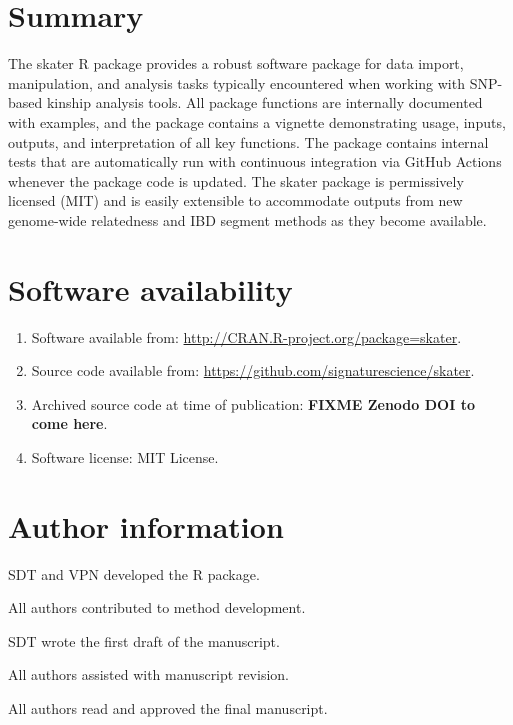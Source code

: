 \documentclass[9pt,a4paper,]{extarticle}
\begin{document}
\hypertarget{summary}{%
\section{Summary}\label{summary}}

The skater R package provides a robust software package for data import, manipulation, and analysis tasks typically encountered when working with SNP-based kinship analysis tools. All package functions are internally documented with examples, and the package contains a vignette demonstrating usage, inputs, outputs, and interpretation of all key functions. The package contains internal tests that are automatically run with continuous integration via GitHub Actions whenever the package code is updated. The skater package is permissively licensed (MIT) and is easily extensible to accommodate outputs from new genome-wide relatedness and IBD segment methods as they become available.

\hypertarget{software-availability}{%
\section{Software availability}\label{software-availability}}

\begin{enumerate}
\def\labelenumi{\arabic{enumi}.}
\item
  Software available from: \url{http://CRAN.R-project.org/package=skater}.
\item
  Source code available from: \url{https://github.com/signaturescience/skater}.
\item
  Archived source code at time of publication: \textbf{FIXME Zenodo DOI to come here}.
\item
  Software license: MIT License.
\end{enumerate}

\hypertarget{author-information}{%
\section{Author information}\label{author-information}}

SDT and VPN developed the R package.

All authors contributed to method development.

SDT wrote the first draft of the manuscript.

All authors assisted with manuscript revision.

All authors read and approved the final manuscript.
\end{document}
